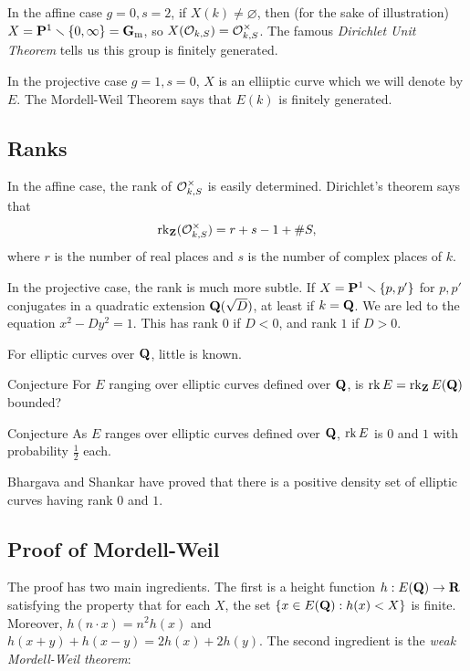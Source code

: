 In the affine case $g=0,s=2$, if $X(k)\ne\varnothing$, then (for the sake of 
illustration) $X = \mathbf{P}^1\smallsetminus \{0,\infty\} = \mathbf{G}_{\mathrm{m}}$, so 
$X(\mathcal{O}_{k,S}) = \mathcal{O}_{k,S}^\times$. The famous \emph{Dirichlet Unit Theorem} 
tells us this group is finitely generated. 

In the projective case $g=1,s=0$, $X$ is an elliiptic curve which we will 
denote by $E$. The Mordell-Weil Theorem says that $E(k)$ is finitely 
generated. 





\subsection{Ranks}

In the affine case, the rank of $\mathcal{O}_{k,S}^\times$ is easily determined. 
Dirichlet's theorem says that 
\[
  \operatorname{rk}_{\mathbf{Z}}(\mathcal{O}_{k,S}^\times) = r+s-1+\# S ,
\]
where $r$ is the number of real places and $s$ is the number of complex 
places of $k$. 

In the projective case, the rank is much more subtle. If 
$X=\mathbf{P}^1\smallsetminus \{p,p'\}$ for $p,p'$ conjugates in a quadratic 
extension $\mathbf{Q}(\sqrt D)$, at least if $k=\mathbf{Q}$. We are led to the equation 
$x^2-D y^2=1$. This has rank $0$ if $D<0$, and rank $1$ if $D>0$. 

For elliptic curves over $\mathbf{Q}$, little is known. 

\begin{enonce}{Conjecture}
For $E$ ranging over elliptic curves defined over $\mathbf{Q}$, 
is $\operatorname{rk} E=\operatorname{rk}_{\mathbf{Z}} E(\mathbf{Q})$ bounded?
\end{enonce}

\begin{enonce}{Conjecture}
As $E$ ranges over elliptic curves defined over $\mathbf{Q}$, 
$\operatorname{rk} E$ is $0$ and $1$ with probability $\frac 1 2$ each. 
\end{enonce}

Bhargava and Shankar have proved that there is a positive density set of 
elliptic curves having rank $0$ and $1$. 





\subsection{Proof of Mordell-Weil}

The proof has two main ingredients. The first is a height function 
$h:E(\mathbf{Q}) \to \mathbf{R}$ satisfying the property that for each $X$, the set 
$\{x\in E(\mathbf{Q}):h(x)<X\}$ is finite. Moreover, 
$h(n\cdot x) = n^2 h(x)$ and $h(x+y)+h(x-y)=2 h(x) + 2 h(y)$. The second 
ingredient is the \emph{weak Mordell-Weil theorem}: 

